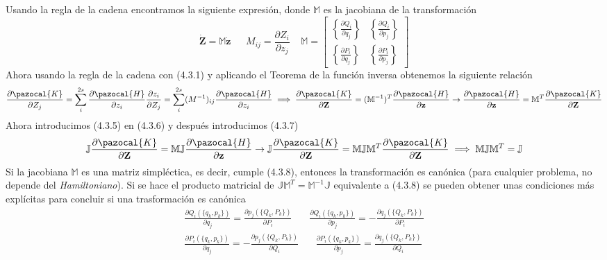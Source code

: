 Usando la regla de la cadena encontramos la siguiente expresión, donde $\mathbb{M}$ es la jacobiana de la transformación
\begin{equation} \label{4.2.7}
    \dot{\mathbf{Z}} = \mathbb{M}\dot{\mathbf{z}}  \ \ \ \ \ \ \ M_{ij} = \frac{\partial Z_i}{\partial z_j} \ \ \ \ \ \mathbb{M} = \left[\begin{array}{cc} \left\{\frac{\partial Q_i}{\partial q_j}\right\} & \left\{\frac{\partial Q_i}{\partial p_j}\right\} \\  \left\{\frac{\partial P_i}{\partial q_j}\right\} & \left\{\frac{\partial P_i}{\partial p_j}\right\} \end{array}\right]
\end{equation} 
Ahora usando la regla de la cadena con (4.3.1) y aplicando el Teorema de la función inversa obtenemos la siguiente relación 
\begin{equation} \label{4.2.7}
    \frac{\partial \pazocal{K}}{\partial Z_j} = \sum_i^{2s} \frac{\partial \pazocal{H}}{\partial z_i} \frac{\partial z_i}{\partial Z_j} = \sum_i^{2s} ({M^{-1}})_{ij} \frac{\partial \pazocal{H}}{\partial z_i} \implies \frac{\partial \pazocal{K}}{\partial \mathbf{Z}} = (\mathbb{M}^{-1})^T \frac{\partial \pazocal{H}}{\partial \mathbf{z}} \rightarrow  \frac{\partial \pazocal{H}}{\partial \mathbf{z}}  = \mathbb{M}^T \frac{\partial \pazocal{K}}{\partial \mathbf{Z}}
\end{equation} 
Ahora introducimos (4.3.5) en (4.3.6) y después introducimos (4.3.7)
\begin{equation} \label{4.2.7}
    \mathbb{J} \frac{\partial \pazocal{K}}{\partial \mathbf{Z}} = \mathbb{M}\mathbb{J} \frac{\partial \pazocal{H}}{\partial \mathbf{z}} \rightarrow \mathbb{J} \frac{\partial \pazocal{K}}{\partial \mathbf{Z}} = \mathbb{M}\mathbb{J} \mathbb{M}^T \frac{\partial \pazocal{K}}{\partial \mathbf{Z}} \implies \mathbb{M}\mathbb{J} \mathbb{M}^T = \mathbb{J} 
\end{equation} 
Si la jacobiana $\mathbb{M}$ es una matriz simpléctica, es decir, cumple (4.3.8), entonces la transformación es canónica (para cualquier problema, no depende del \textit{Hamiltoniano}).
\newpage
Si se hace el producto matricial de $\mathbb{J} \mathbb{M}^T = \mathbb{M}^{-1}\mathbb{J}$ equivalente a (4.3.8) se pueden obtener unas condiciones más explícitas para concluir si una trasformación es canónica
\begin{equation} \label{4.2.7}
    \begin{split}
        \frac{\partial Q_i(\{q_k,p_k\})}{\partial q_j} = \frac{\partial p_j(\{Q_k,P_k\})}{\partial P_i} \ \ \ \ \ \ \ \ \frac{\partial Q_i(\{q_k,p_k\})}{\partial p_j} = -\frac{\partial q_j(\{Q_k,P_k\})}{\partial P_i} \\ 
        \frac{\partial P_i(\{q_k,p_k\})}{\partial q_j} = -\frac{\partial p_j(\{Q_k,P_k\})}{\partial Q_i} \ \ \ \ \ \ \ \ \frac{\partial P_i(\{q_k,p_k\})}{\partial p_j} = \frac{\partial q_j(\{Q_k,P_k\})}{\partial Q_i}
    \end{split}
\end{equation} 
